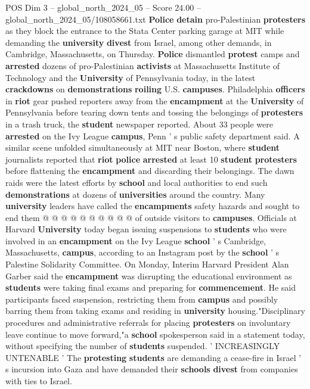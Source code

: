 \begin{textsample}{POS Dim 3 – global\_north\_2024\_05 – Score 24.00 – global\_north\_2024\_05/108058661.txt}  \label{ex:f3_pos_004}
\textbf{Police} \textbf{detain} pro-Palestinian \textbf{protesters} as they block the entrance to the Stata Center parking garage at MIT while demanding the \textbf{university} \textbf{divest} from Israel, among other demands, in Cambridge, Massachusetts, on Thursday. \textbf{Police} dismantled \textbf{protest} camps and \textbf{arrested} dozens of pro-Palestinian \textbf{activists} at Massachusetts Institute of Technology and the \textbf{University} of Pennsylvania today, in the latest \textbf{crackdowns} on \textbf{demonstrations} \textbf{roiling} U.S. \textbf{campuses}.
Philadelphia \textbf{officers} in \textbf{riot} gear pushed reporters away from the \textbf{encampment} at the \textbf{University} of Pennsylvania before tearing down tents and tossing the belongings of \textbf{protesters} in a trash truck, the \textbf{student} newspaper reported.
About 33 people were \textbf{arrested} on the Ivy League \textbf{campus}, Penn ' s public safety department said.
A similar scene unfolded simultaneously at MIT near Boston, where \textbf{student} journalists reported that \textbf{riot} \textbf{police} \textbf{arrested} at least 10 \textbf{student} \textbf{protesters} before flattening the \textbf{encampment} and discarding their belongings.
The dawn raids were the latest efforts by \textbf{school} and local authorities to end such \textbf{demonstrations} at dozens of \textbf{universities} around the country.
Many \textbf{university} leaders have called the \textbf{encampments} safety hazards and sought to end them @ @ @ @ @ @ @ @ @ @ of outside visitors to \textbf{campuses}.
Officials at Harvard \textbf{University} today began issuing suspensions to \textbf{students} who were involved in an \textbf{encampment} on the Ivy League \textbf{school} ' s Cambridge, Massachusetts, \textbf{campus}, according to an Instagram post by the \textbf{school} ' s Palestine Solidarity Committee.
On Monday, Interim Harvard President Alan Garber said the \textbf{encampment} was disrupting the educational environment as \textbf{students} were taking final exams and preparing for \textbf{commencement}.
He said participants faced suspension, restricting them from \textbf{campus} and possibly barring them from taking exams and residing in \textbf{university} housing."Disciplinary procedures and administrative referrals for placing \textbf{protesters} on involuntary leave continue to move forward,"a \textbf{school} spokesperson said in a statement today, without specifying the number of \textbf{students} suspended. ' INCREASINGLY UNTENABLE ' The \textbf{protesting} \textbf{students} are demanding a cease-fire in Israel ' s incursion into Gaza and have demanded their \textbf{schools} \textbf{divest} from companies with ties to Israel.

\end{textsample}
